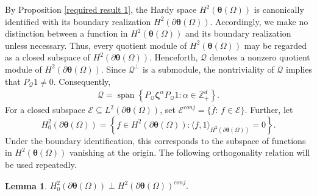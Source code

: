 \documentclass[12pt,reqno]{amsart}
\newtheorem{lemma}[theorem]{Lemma}%
\theoremstyle{remark}
\theoremstyle{definition}
\newcommand{\beq}{\begin{eqnarray}}
\newcommand{\eeq}{\end{eqnarray}}
\begin{document}
By Proposition \ref{required result 1}, the Hardy space $H^2(\boldsymbol \theta(\Omega))$ is canonically identified with its boundary realization $H^2(\partial\boldsymbol \theta(\Omega)).$ 
Accordingly, we make no distinction between a function in $H^2(\boldsymbol \theta(\Omega))$ and its boundary realization unless necessary. Thus, every quotient module of $H^2(\boldsymbol \theta(\Omega))$ may be regarded as a closed subspace of $H^2(\partial\boldsymbol \theta(\Omega))$.
Henceforth, $\mathcal Q$ denotes a nonzero quotient module of $H^2(\partial\boldsymbol \theta(\Omega))$. 
Since $\mathcal{Q}^\perp$ is a submodule, the nontriviality of $\mathcal{Q}$ implies that $P_{\mathcal Q}1\neq 0.$
Consequently, \beq \label{Q description}\mathcal Q = \overline{\operatorname{span}}\left\{P_{\mathcal Q}\boldsymbol \zeta^\alpha P_{\mathcal Q}1: \alpha\in \mathbb Z_+^d\right\}.\eeq
For a closed subspace $\mathcal E\subseteq L^2(\partial\boldsymbol \theta(\Omega))$, set
$\mathcal E^{conj}=\{\bar{f}:\, f\in \mathcal E\}.$
Further, let $$H_0^2(\partial\boldsymbol \theta(\Omega))=\left\{f\in H^2(\partial\boldsymbol \theta(\Omega)):\langle f,1\rangle_{H^2(\partial\boldsymbol \theta(\Omega))}=0\right\}.$$
Under the boundary identification, this corresponds to the subspace of functions in $H^2(\boldsymbol \theta(\Omega))$ vanishing at the origin.
The following orthogonality relation will be used repeatedly.
\begin{lemma}\label{orthogonality}
    $H^2_0(\partial\boldsymbol \theta(\Omega))\perp H^2(\partial\boldsymbol \theta(\Omega))^{conj}.$
\end{lemma}
\end{document}
